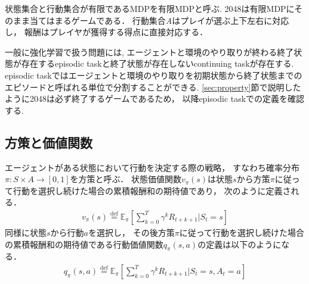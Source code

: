 状態集合と行動集合が有限であるMDPを有限MDPと呼ぶ.
2048は有限MDPにそのまま当てはまるゲームである．
行動集合\textit{A}はプレイが選ぶ上下左右に対応し， 報酬はプレイヤが獲得する得点に直接対応する．

一般に強化学習で扱う問題には, エージェントと環境のやり取りが終わる終了状態が存在するepisodic taskと終了状態が存在しないcontinuing taskが存在する. 
episodic taskではエージェントと環境のやり取りを初期状態から終了状態までのエピソードと呼ばれる単位で分割することができる.
\ref{sec:property}節で説明したように2048は必ず終了するゲームであるため， 以降episodic taskでの定義を確認する. 

\subsection{方策と価値関数}
エージェントがある状態において行動を決定する際の戦略， すなわち確率分布$\pi:S \times A \rightarrow [0,1]$を方策と呼ぶ．
状態価値関数$v_{\pi}(s)$は状態$s$から方策$\pi$に従って行動を選択し続けた場合の累積報酬和の期待値であり， 次のように定義される．
\begin{align}
  v_{\pi}(s) \stackrel{\mathrm{def}}{=} \mathbb{E}_{\pi}\left[\sum_{k=0}^T \gamma^k R_{t+k+1}|S_t=s \right]
\end{align}
同様に状態$s$から行動$a$を選択し， その後方策$\pi$に従って行動を選択し続けた場合の累積報酬和の期待値である行動価値関数$q_{\pi}(s,a)$の定義は以下のようになる．
\begin{align}
  q_{\pi}(s,a) \stackrel{\mathrm{def}}{=} \mathbb{E}_{\pi}\left[\sum_{k=0}^T \gamma^k R_{t+k+1}|S_t=s, A_t=a \right]
\end{align}

